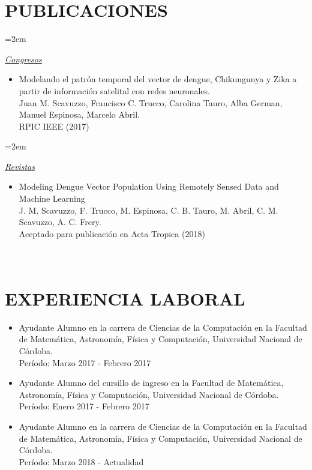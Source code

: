 \documentclass[paper=a4,fontsize=11pt]{scrartcl} %
\newlength{\spacebox}
\newcommand{\NewPart}[1]{\section*{\uppercase{#1}}}
\newcommand{\PersonalEntry}[2]{
		\noindent\hangindent=2em\hangafter=0 %
		\parbox{\spacebox}{        %
		\textit{#1}}		       %
		\hspace{1.5em} #2 \par}    %
\newcommand{\SkillsEntry}[2]{      %
		\noindent\hangindent=2em\hangafter=0 %
		\parbox{\spacebox}{        %
		\textit{#1}}			   %
		\hspace{1.5em} #2 \par}    %
\begin{document}
\NewPart{Publicaciones}{}

\SkillsEntry{\underline{Congresos}}{
\begin{itemize}

\item{Modelando el patrón temporal del vector de dengue, Chikungunya y Zika a partir de información satelital con redes neuronales. \\ Juan M. Scavuzzo, Francisco C. Trucco, Carolina Tauro, Alba German, Manuel Espinosa, Marcelo Abril.\\ RPIC IEEE (2017)}

\end{itemize}
}

\SkillsEntry{\underline{Revistas}}{
\begin{itemize}

\item{Modeling Dengue Vector Population Using Remotely Sensed Data and Machine Learning \\ J. M. Scavuzzo, F. Trucco, M. Espinosa, C. B. Tauro, M. Abril, C. M. Scavuzzo, A. C. Frery.\\ Aceptado para publicación en Acta Tropica (2018)}

\end{itemize}
}


\NewPart{\\ Experiencia laboral}{}

\begin{itemize}

    \item{Ayudante Alumno en la carrera de Ciencias de la Computación en la Facultad de Matemática, Astronomía, Física y Computación, Universidad Nacional de Córdoba.}{\\ Período: Marzo 2017 - Febrero 2017}{}

    \item{Ayudante Alumno del cursillo de ingreso en la Facultad de Matemática, Astronomía, Física y Computación, Universidad Nacional de Córdoba.}{\\ Período: Enero 2017 - Febrero 2017}{}

    \item{Ayudante Alumno en la carrera de Ciencias de la Computación en la Facultad de Matemática, Astronomía, Física y Computación, Universidad Nacional de Córdoba.}{\\ Período: Marzo 2018 - Actualidad}{}

\end{itemize}
\end{document}
